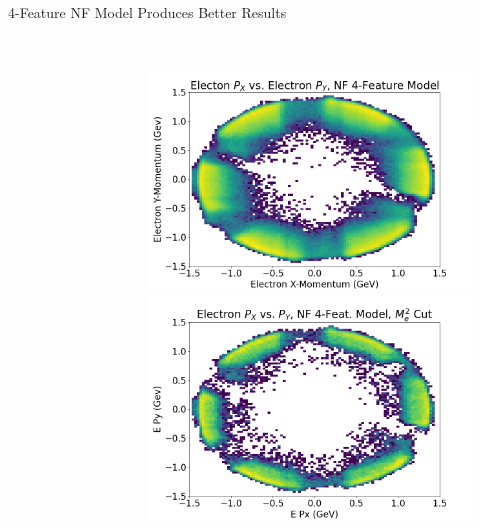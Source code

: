 \documentclass[aspectratio=169]{beamer}
\begin{document}
\begin{frame}{4-Feature NF Model Produces Better Results}
\begin{columns}
\begin{figure}[H]
            
            \label{fig:clas6}
            \end{figure}
            
             \begin{figure}[H]
            \centering
            \includegraphics[width=.97\textwidth]{images/2D_Hists_4F/Electon_P_X_vs_Electron_P_Y,_NF_4-Feature_Model.png}
            \includegraphics[width=.97\textwidth]{images/2D_Hists_4F/Electron_P_X_vs_P_Y,_NF_4-Feat_Model,_M_e2_Cut.png}
            
            \end{figure}
    \end{columns}
\end{frame}
\end{document}
